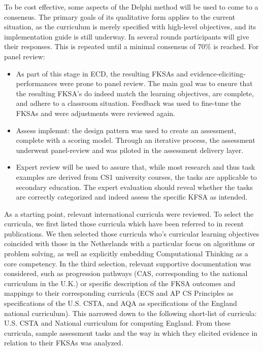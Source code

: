 To be cost effective, some aspects of the Delphi method will be used to come to a consensus. The primary goals of its qualitative form applies to the current situation, as the curriculum is merely specified with high-level objectives, and its implementation guide is still underway. In several rounds participants will give their responses. This is repeated until a minimal consensus of 70\% is reached.
For panel review:
\begin{itemize}
\item As part of this stage in ECD, the resulting FKSAs and evidence-eliciting-performances were prone to panel review. The main goal was to ensure that the resulting FKSA’s do indeed match the learning objectives, are complete, and adhere to a classroom situation. Feedback was used to fine-tune the FKSAs and were adjustments were reviewed again.
\item Assess implemnt: the design pattern was used to create an assessment, complete with a scoring model. Through an iterative process, the assessment underwent panel-review and was piloted in the assessment delivery layer.
\item Expert review will be used to assure that, while most research and thus task examples are derived from CS1 university courses, the tasks are applicable to secondary education. The expert evaluation should reveal whether the tasks are correctly categorized and indeed assess the specific KFSA as intended.
\end{itemize}

As a starting point, relevant international curricula were reviewed. To select the curricula, we first listed those curricula which have been referred to in recent publications. We then selected those curricula who’s curricular learning objectives coincided with those in the Netherlands with a particular focus on algorithms or problem solving, as well as explicitly embedding Computational Thinking as a core competency. In the third selection, relevant supportive documentation was considered, such as progression pathways (CAS, corresponding to the national curriculum in the U.K.) or specific description of the FKSA outcomes and mappings to their corresponding curricula (ECS and AP CS Principles as specifications of the U.S. CSTA, and AQA as specifications of the England national curriculum). This narrowed down to the following short-list of curricula: U.S. CSTA and National curriculum for computing England. From these curricula, sample assessment tasks and the way in which they elicited evidence in relation to their FKSAs was analyzed.


